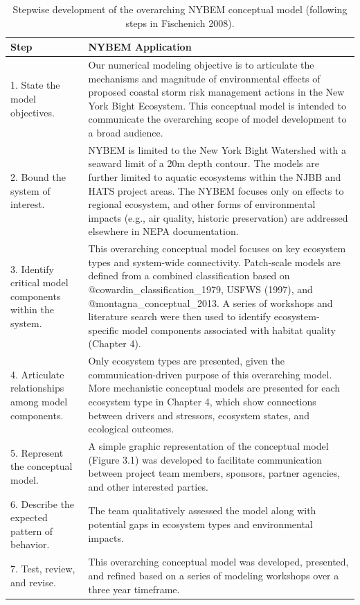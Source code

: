 \documentclass[
]{book}
\begin{document}
\begin{table}

\caption{\label{tab:unnamed-chunk-5}Stepwise development of the overarching NYBEM conceptual model (following steps in Fischenich 2008).}
\centering
\begin{tabular}[t]{l|l}
\hline
Step & NYBEM Application\\
\hline
1. State the model objectives. & Our numerical modeling objective is to articulate the mechanisms and magnitude of environmental effects of proposed coastal storm risk management actions in the New York Bight Ecosystem. This conceptual model is intended to communicate the overarching scope of model development to a broad audience.\\
\hline
2. Bound the system of interest. & NYBEM is limited to the New York Bight Watershed with a seaward limit of a 20m depth contour. The models are further limited to aquatic ecosystems within the NJBB and HATS project areas. The NYBEM focuses only on effects to regional ecosystem, and other forms of environmental impacts (e.g., air quality, historic preservation) are addressed elsewhere in NEPA documentation.\\
\hline
3. Identify critical model components within the system. & This overarching conceptual model focuses on key ecosystem types and system-wide connectivity. Patch-scale models are defined from a combined classification based on @cowardin\_classification\_1979, USFWS (1997), and @montagna\_conceptual\_2013. A series of workshops and literature search were then used to identify ecosystem-specific model components associated with habitat quality (Chapter 4).\\
\hline
4. Articulate relationships among model components. & Only ecosystem types are presented, given the communication-driven purpose of this overarching model. More mechanistic conceptual models are presented for each ecosystem type in Chapter 4, which show connections between drivers and stressors, ecosystem states, and ecological outcomes.\\
\hline
5. Represent the conceptual model. & A simple graphic representation of the conceptual model (Figure 3.1) was developed to facilitate communication between project team members, sponsors, partner agencies, and other interested parties.\\
\hline
6. Describe the expected pattern of behavior. & The team qualitatively assessed the model along with potential gaps in ecosystem types and environmental impacts.\\
\hline
7. Test, review, and revise. & This overarching conceptual model was developed, presented, and refined based on a series of modeling workshops over a three year timeframe.\\
\hline
\end{tabular}
\end{table}
\end{document}
